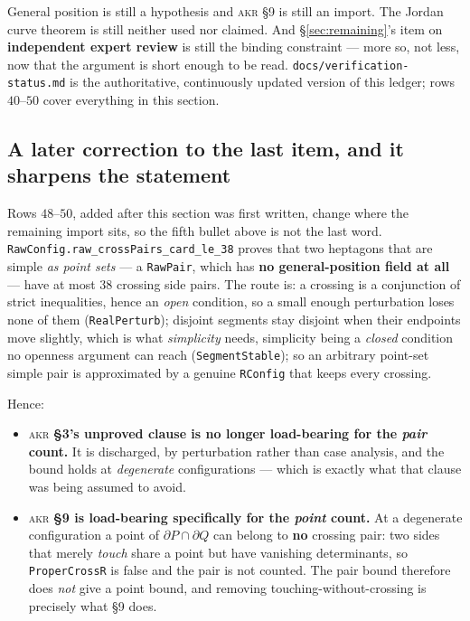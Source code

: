 \documentclass[11pt,a4paper]{article}
\theoremstyle{plain}
\theoremstyle{definition}
\theoremstyle{remark}
\begin{document}
General position is still a hypothesis and \textsc{akr} \S9 is still an import.
The Jordan curve theorem is still neither used nor claimed. And
\S\ref{sec:remaining}'s item on \textbf{independent expert review} is still the
binding constraint --- more so, not less, now that the argument is short enough
to be read. \texttt{docs/verification-status.md} is the authoritative,
continuously updated version of this ledger; rows $40$--$50$ cover everything in
this section.

\subsection*{\texorpdfstring{A later correction to the last item, and it sharpens the statement}{A later correction to the last item}}

Rows $48$--$50$, added after this section was first written, change where the
remaining import sits, so the fifth bullet above is not the last word.
\texttt{RawConfig.raw\_crossPairs\_card\_le\_38} proves that two heptagons that
are simple \emph{as point sets} --- a \texttt{RawPair}, which has \textbf{no
general-position field at all} --- have at most $38$ crossing side pairs. The
route is: a crossing is a conjunction of strict inequalities, hence an
\emph{open} condition, so a small enough perturbation loses none of them
(\texttt{RealPerturb}); disjoint segments stay disjoint when their endpoints
move slightly, which is what \emph{simplicity} needs, simplicity being a
\emph{closed} condition no openness argument can reach
(\texttt{SegmentStable}); so an arbitrary point-set simple pair is approximated
by a genuine \texttt{RConfig} that keeps every crossing.

Hence:
\begin{itemize}[leftmargin=*]
  \item \textsc{akr} \textbf{\S3's unproved clause is no longer load-bearing
    for the \emph{pair} count.} It is discharged, by perturbation rather than
    case analysis, and the bound holds at \emph{degenerate} configurations ---
    which is exactly what that clause was being assumed to avoid.
  \item \textsc{akr} \textbf{\S9 is load-bearing specifically for the
    \emph{point} count.} At a degenerate configuration a point of
    $\partial P\cap\partial Q$ can belong to \textbf{no} crossing pair: two
    sides that merely \emph{touch} share a point but have vanishing
    determinants, so \texttt{ProperCrossR} is false and the pair is not
    counted. The pair bound therefore does \emph{not} give a point bound, and
    removing touching-without-crossing is precisely what \S9 does.
\end{itemize}
\end{document}
